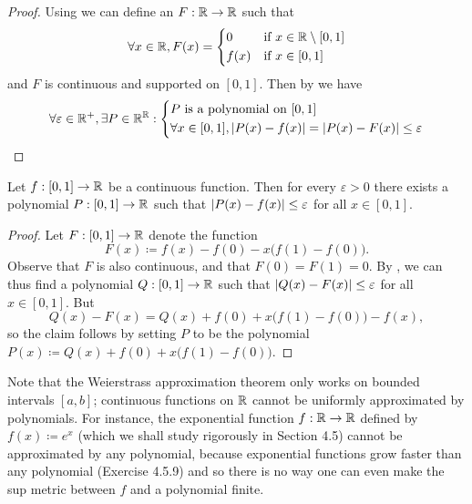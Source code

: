 \begin{proof}
  Using  we can define an \(F : \mathbb{R} \to \mathbb{R}\) such that
  \[
    \forall x \in \mathbb{R}, F(x) = \begin{dcases}
      0    & \text{if } x \in \mathbb{R} \setminus [0, 1] \\
      f(x) & \text{if } x \in [0, 1]
    \end{dcases}
  \]
  and \(F\) is continuous and supported on \([0, 1]\).
  Then by  we have
  \[
    \forall \varepsilon \in \mathbb{R}^+, \exists P \in \mathbb{R}^{\mathbb{R}} : \begin{dcases}
      P \text{ is a polynomial on } [0, 1] \\
      \forall x \in [0, 1], \left\lvert P(x) - f(x)\right\rvert = \left\lvert P(x) - F(x)\right\rvert \leq \varepsilon
    \end{dcases}
  \]
\end{proof}

\begin{cor}\label{ii:3.8.19}
  Let \(f : [0, 1] \to \mathbb{R}\) be a continuous function.
  Then for every \(\varepsilon > 0\) there exists a polynomial \(P : [0, 1] \to \mathbb{R}\) such that \(\left\lvert P(x) - f(x)\right\rvert \leq \varepsilon\) for all \(x \in [0, 1]\).
\end{cor}

\begin{proof}
  Let \(F : [0, 1] \to \mathbb{R}\) denote the function
  \[
    F(x) \coloneqq f(x) - f(0) - x \big(f(1) - f(0)\big).
  \]
  Observe that \(F\) is also continuous, and that \(F(0) = F(1) = 0\).
  By , we can thus find a polynomial \(Q : [0, 1] \to \mathbb{R}\) such that \(\left\lvert Q(x) - F(x)\right\rvert \leq \varepsilon\) for all \(x \in [0, 1]\).
  But
  \[
    Q(x) - F(x) = Q(x) + f(0) + x \big(f(1) - f(0)\big) - f(x),
  \]
  so the claim follows by setting \(P\) to be the polynomial \(P(x) \coloneqq Q(x) + f(0) + x \big(f(1) - f(0)\big)\).
\end{proof}

\begin{rmk}\label{ii:3.8.20}
  Note that the Weierstrass approximation theorem only works on bounded intervals \([a, b]\);
  continuous functions on \(\mathbb{R}\) cannot be uniformly approximated by polynomials.
  For instance, the exponential function \(f : \mathbb{R} \to \mathbb{R}\) defined by \(f(x) \coloneqq e^x\) (which we shall study rigorously in Section 4.5) cannot be approximated by any polynomial, because exponential functions grow faster than any polynomial (Exercise 4.5.9) and so there is no way one can even make the sup metric between \(f\) and a polynomial finite.
\end{rmk}

